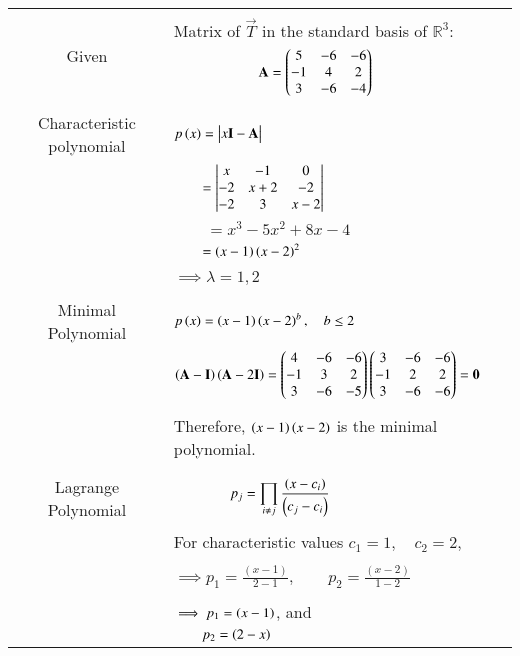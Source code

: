 \begin{longtable}{|c|l|}
    \hline
    \multirow{3}{*}{Given} 
	& \\
	&Matrix of $\vec{T}$ in the standard basis of $\mathbb{R}^3:$\\
	& $\qquad\qquad\qquad\mathbf{A}=\begin{pmatrix}5&-6&-6\\-1&4&2\\3&-6&-4\end{pmatrix}$\\
	&\\
	\hline
	\multirow{3}{*}{Characteristic polynomial} 
	& \\
	& $p\brak{x}=\mydet{x\Vec{I}-\Vec{A}}$\\
	&\\
	& $\qquad = \begin{vmatrix}x&-1&0\\-2&x+2&-2\\-2&3&x-2\end{vmatrix}$\\
	& $\qquad=x^3-5x^2+8x-4$\\
	&$\qquad=\left(x-1\right)\left(x-2\right)^2$\\
	&\\
	&$\implies \lambda=1, 2$\\
	&\\
	\hline
	\multirow{3}{*}{Minimal Polynomial} & \\
	& $p\left(x\right)=\left(x-1\right)\left(x-2\right)^b,\quad b\leq2$\\
	&\\
	&$\left(\mathbf{A}-\mathbf{I}\right)\left(\mathbf{A}-2\mathbf{I}\right)=\begin{pmatrix}4&-6&-6\\-1&3&2\\3&-6&-5\end{pmatrix}\begin{pmatrix}3&-6&-6\\-1&2&2\\3&-6&-6\end{pmatrix}=\mathbf{0}$\\
	&\\
	&Therefore, $\left(x-1\right)\left(x-2\right)$ is the minimal polynomial.\\
	&\\
	\hline
	\multirow{3}{*}{Lagrange Polynomial} 
	& \\
	& $\qquad\qquad p_j=\displaystyle\prod_{i\neq j} \frac{\left(x-c_i\right)}{\left(c_j-c_i\right)}$\\
	&\\
	& For characteristic values $c_1=1,\quad c_2=2$,\\
	&\\
	& $\implies p_1=\frac{(x-1)}{2-1}, \qquad p_2=\frac{(x-2)}{1-2}$\\
	&\\
	& $\implies p_1= \left(x-1\right)$, and\\
	&$\qquad p_2=\left(2-x\right)$\\

\end{longtable}
